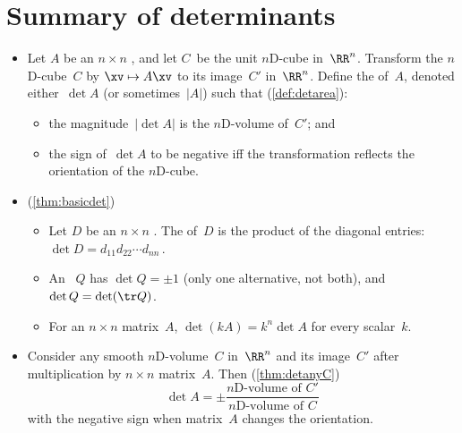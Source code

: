 
\section{Summary of determinants}
\label{sec:sumd}


\begin{itemize}
\def\index#1{}%

\subsubsection*{Geometry underlies determinants}

\item Let \(A\) be an \(n\times n\) , and let \(C\)~be the unit \index{nD-cube@$n$D-cube}$n$D-cube in~\(\RR^n\).
Transform the \(n\)D-cube~\(C\) by \(\xv\mapsto A\xv\) to its image~\(C'\) in~\(\RR^n\). 
Define the  of~\(A\), denoted either~\(\det A\) (or sometimes~\(|A|\)) such that (\autoref{def:detarea}):  \begin{itemize}
\item the magnitude~\(|\det A|\) is the \index{nD-volume@$n$D-volume}$n$D-volume of~\(C'\); and 
\item the sign of~\(\det A\) to be negative iff the transformation reflects the orientation of the $n$D-cube.
\end{itemize}

\item (\autoref{thm:basicdet})
\begin{itemize}
\item   Let \(D\) be an \(n\times n\) .
The  of~\(D\) is the product of the diagonal entries: \(\det D=d_{11}d_{22}\cdots d_{nn}\)\,.
\item  An ~\(Q\) has  \(\det Q=\pm1\) (only one alternative, not both), and \(\det Q=\det(\tr Q)\).
\item   For an \(n\times n\) matrix~\(A\), \(\det(kA)=k^n\det A\) for every scalar~\(k\).
\end{itemize}

\item Consider any  smooth \index{nD-volume@$n$D-volume}$n$D-volume~\(C\) in~\(\RR^n\) and its image~\(C'\) after multiplication by \(n\times n\) matrix~\(A\).
Then (\autoref{thm:detanyC})
\begin{equation*}
\det A=\pm\frac{\text{$n$D-volume of }C'}
{\text{$n$D-volume of }C}
\end{equation*}
with the negative sign when matrix~\(A\) changes the orientation.


\end{itemize}
